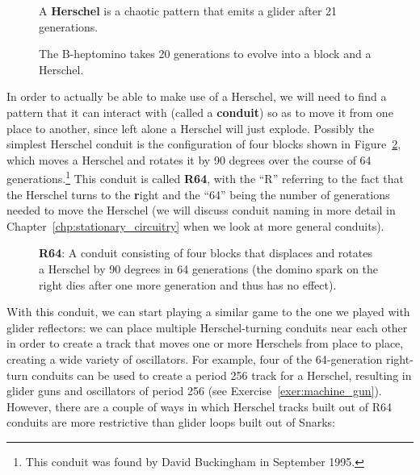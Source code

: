 \begin{figure}[!htb]
	\centering
	\begin{minipage}{.43\textwidth}
		\centering{}
		\caption{A \textbf{Herschel} is a chaotic pattern that emits a glider after 21 generations.}\label{fig:herschel}
	\end{minipage} \hfill %
	\begin{minipage}{.53\textwidth}
		\centering{}
		\caption{The B-heptomino takes 20 generations to evolve into a block and a Herschel.}\label{fig:b_heptomino_to_herschel}
	\end{minipage}
\end{figure}

In order to actually be able to make use of a Herschel, we will need to find a pattern that it can interact with (called a \textbf{conduit}) so as to move it from one place to another, since left alone a Herschel will just explode. Possibly the simplest Herschel conduit is the configuration of four blocks shown in Figure~\ref{fig:herschel_64}, which moves a Herschel and rotates it by 90 degrees over the course of 64 generations.\footnote{This conduit was found by David Buckingham in September 1995.} This conduit is called \textbf{R64}, with the ``R'' referring to the fact that the Herschel turns to the \textbf{r}ight and the ``64'' being the number of generations needed to move the Herschel (we will discuss conduit naming in more detail in Chapter~\ref{chp:stationary_circuitry} when we look at more general conduits). 

\begin{figure}[!htb]
	\centering{}
	\caption{\textbf{R64}: A conduit consisting of four blocks that displaces and rotates a Herschel by 90 degrees in 64 generations (the domino spark on the right dies after one more generation and thus has no effect).}\label{fig:herschel_64}
\end{figure}

With this conduit, we can start playing a similar game to the one we played with glider reflectors: we can place multiple Herschel-turning conduits near each other in order to create a track that moves one or more Herschels from place to place, creating a wide variety of oscillators. For example, four of the 64-generation right-turn conduits can be used to create a period 256 track for a Herschel, resulting in glider guns and oscillators of period 256 (see Exercise~\ref{exer:machine_gun}). However, there are a couple of ways in which Herschel tracks built out of R64 conduits are more restrictive than glider loops built out of Snarks:\medskip

